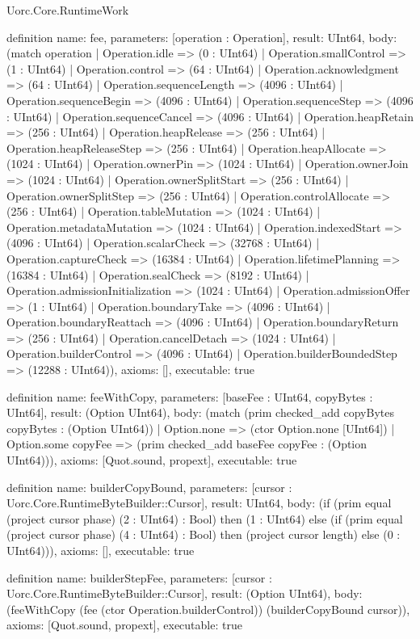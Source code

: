 \begin{lexlean}{Uorc.Core.RuntimeWork}
\begin{semanticmodule}
definition{
  name: fee,
  parameters: [operation : Operation],
  result: UInt64,
  body: (match operation
    | Operation.idle => (0 : UInt64)
    | Operation.smallControl => (1 : UInt64)
    | Operation.control => (64 : UInt64)
    | Operation.acknowledgment => (64 : UInt64)
    | Operation.sequenceLength => (4096 : UInt64)
    | Operation.sequenceBegin => (4096 : UInt64)
    | Operation.sequenceStep => (4096 : UInt64)
    | Operation.sequenceCancel => (4096 : UInt64)
    | Operation.heapRetain => (256 : UInt64)
    | Operation.heapRelease => (256 : UInt64)
    | Operation.heapReleaseStep => (256 : UInt64)
    | Operation.heapAllocate => (1024 : UInt64)
    | Operation.ownerPin => (1024 : UInt64)
    | Operation.ownerJoin => (1024 : UInt64)
    | Operation.ownerSplitStart => (256 : UInt64)
    | Operation.ownerSplitStep => (256 : UInt64)
    | Operation.controlAllocate => (256 : UInt64)
    | Operation.tableMutation => (1024 : UInt64)
    | Operation.metadataMutation => (1024 : UInt64)
    | Operation.indexedStart => (4096 : UInt64)
    | Operation.scalarCheck => (32768 : UInt64)
    | Operation.captureCheck => (16384 : UInt64)
    | Operation.lifetimePlanning => (16384 : UInt64)
    | Operation.sealCheck => (8192 : UInt64)
    | Operation.admissionInitialization => (1024 : UInt64)
    | Operation.admissionOffer => (1 : UInt64)
    | Operation.boundaryTake => (4096 : UInt64)
    | Operation.boundaryReattach => (4096 : UInt64)
    | Operation.boundaryReturn => (256 : UInt64)
    | Operation.cancelDetach => (1024 : UInt64)
    | Operation.builderControl => (4096 : UInt64)
    | Operation.builderBoundedStep => (12288 : UInt64)),
  axioms: [],
  executable: true
}

definition{
  name: feeWithCopy,
  parameters: [baseFee : UInt64, copyBytes : UInt64],
  result: (Option UInt64),
  body: (match (prim checked_add copyBytes copyBytes : (Option UInt64))
    | Option.none => (ctor Option.none [UInt64])
    | Option.some copyFee => (prim checked_add baseFee copyFee : (Option UInt64))),
  axioms: [Quot.sound, propext],
  executable: true
}

definition{
  name: builderCopyBound,
  parameters: [cursor : Uorc.Core.RuntimeByteBuilder::Cursor],
  result: UInt64,
  body: (if (prim equal (project cursor phase) (2 : UInt64) : Bool) then (1 : UInt64) else (if (prim equal (project cursor phase) (4 : UInt64) : Bool) then (project cursor length) else (0 : UInt64))),
  axioms: [],
  executable: true
}

definition{
  name: builderStepFee,
  parameters: [cursor : Uorc.Core.RuntimeByteBuilder::Cursor],
  result: (Option UInt64),
  body: (feeWithCopy (fee (ctor Operation.builderControl)) (builderCopyBound cursor)),
  axioms: [Quot.sound, propext],
  executable: true
}
\end{semanticmodule}
\end{lexlean}
